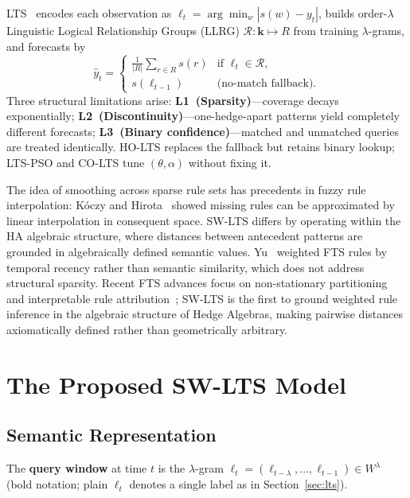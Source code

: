 \documentclass{llncs}
\begin{document}
LTS~\cite{hieu2020lts} encodes each observation as
$\ell_t=\arg\min_{w}|s(w)-y_t|$, builds order-$\lambda$ Linguistic
Logical Relationship Groups (LLRG) $\mathcal{R}:\bm{k}\mapsto R$
from training $\lambda$-grams, and forecasts by
\begin{equation}
  \hat{y}_t =
  \begin{cases}
    \frac{1}{|R|}\sum_{r\in R}s(r) & \text{if } \bm{\ell}_t\in\mathcal{R},\\[3pt]
    s(\ell_{t-1}) & \text{(no-match fallback).}
  \end{cases}
\label{eq:lts}
\end{equation}
Three structural limitations arise: \textbf{L1~(Sparsity)}---coverage
decays exponentially; \textbf{L2~(Discontinuity)}---one-hedge-apart
patterns yield completely different forecasts;
\textbf{L3~(Binary confidence)}---matched and unmatched queries are
treated identically. HO-LTS replaces the fallback but retains binary
lookup; LTS-PSO and CO-LTS tune $(\theta,\alpha)$ without fixing it.

The idea of smoothing across sparse rule sets has precedents in fuzzy
rule interpolation: K\'{o}czy and Hirota~\cite{koczy1993fri} showed
missing rules can be approximated by linear interpolation in
consequent space. SW-LTS differs by operating within the HA algebraic
structure, where distances between antecedent patterns are grounded in
algebraically defined semantic values. Yu~\cite{yu2005} weighted FTS
rules by temporal recency rather than semantic similarity, which does
not address structural sparsity. Recent FTS advances focus on
non-stationary partitioning~\cite{dixit2023fts} and interpretable
rule attribution~\cite{feng2025interp}; SW-LTS is the first to ground
weighted rule inference in the algebraic structure of Hedge Algebras,
making pairwise distances axiomatically defined rather than
geometrically arbitrary.

\section{The Proposed SW-LTS Model}
\label{sec:method}

\subsection{Semantic Representation}

The \textbf{query window} at time $t$ is the $\lambda$-gram
$\bm{\ell}_t = (\ell_{t-\lambda}, \ldots, \ell_{t-1}) \in W^\lambda$
(bold notation; plain $\ell_t$ denotes a single label as in
Section~\ref{sec:lts}).
\end{document}
